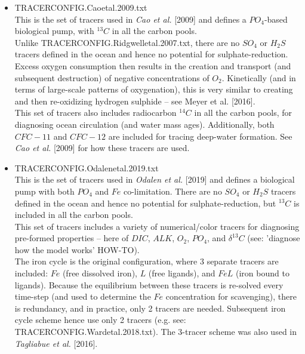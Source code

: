 \documentclass[11pt,fleqn]{book} %
\begin{document}
\begin{itemize}[noitemsep]
\vspace{2mm}
\item \textsf{\small TRACERCONFIG.Caoetal.2009.txt}
\vspace{1mm}
\\This is the set of tracers used in \textit{Cao et al.} [2009] and defines a \(PO_{4}\)-based biological pump, with \(^{13}C\) in all the carbon pools. \\Unlike \textsf{\footnotesize TRACERCONFIG.Ridgwelletal.2007.txt}, there are no \(SO_{4}\) or \(H_{2}S\) tracers defined in the ocean and hence no potential for sulphate-reduction. Excess oxygen consumption then results in the creation and transport (and subsequent destruction) of negative concentrations of \(O_{2}\). Kinetically (and in terms of large-scale patterns of oxygenation), this is very similar to creating and then re-oxidizing hydrogen sulphide -- see Meyer et al. [2016].
\\This set of tracers also includes radiocarbon \(^{14}C\) in all the carbon pools, for diagnosing ocean circulation (and water mass ages). Additionally, both \(CFC-11\) and \(CFC-12\) are included for tracing deep-water formation. See \textit{Cao et al.} [2009] for how these tracers are used.

\vspace{2mm}
\item \textsf{\small TRACERCONFIG.Odalenetal.2019.txt}
\vspace{1mm}
\\This is the set of tracers used in \textit{Odalen et al.} [2019] and defines a biological pump with both \(PO_{4}\) and \(Fe\) co-limitation. There are no \(SO_{4}\) or \(H_{2}S\) tracers defined in the ocean and hence no potential for sulphate-reduction, but \(^{13}C\) is included in all the carbon pools.
\\This set of tracers includes a variety of numerical/color tracers for diagnosing pre-formed properties -- here of \(DIC\), \(ALK\), \(O_{2}\), \(PO_{4}\), and \(\delta^{13}C\) (see: 'diagnose how the model works' HOW-TO).
\\The iron cycle is the original configuration, where 3 separate tracers are included: \(Fe\) (free dissolved iron), \(L\) (free ligands), and \(FeL\) (iron bound to ligands). Because the equilibrium between these tracers is re-solved every time-step (and used to determine the \(Fe\) concentration for scavenging), there is redundancy, and in practice, only 2 tracers are needed. Subsequent iron cycle scheme hence use only 2 tracers (e.g. see: \textsf{\footnotesize TRACERCONFIG.Wardetal.2018.txt}). The 3-tracer scheme was also used in \textit{Tagliabue et al.} [2016].


\end{itemize}
\end{document}
